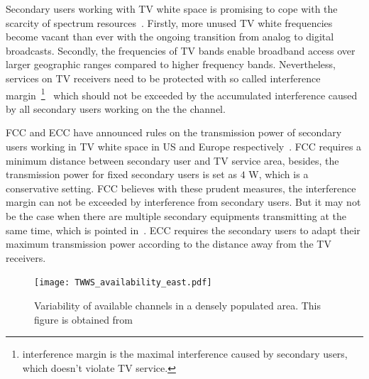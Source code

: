 \documentclass[times]{ettauth}
\theoremstyle{mytheoremstyle}
\theoremstyle{mytheoremstyle}
\theoremstyle{mytheoremstyle}
\begin{document}
Secondary users working with TV white space is promising to cope with the scarcity of spectrum resources~\cite{FCC_2010_sedond_memorandumm}. 
Firstly, more unused TV white frequencies become vacant than ever with the ongoing transition from analog to digital broadcasts. Secondly, the frequencies of TV bands enable broadband access over larger geographic ranges compared to higher frequency bands. Nevertheless, services on TV receivers need to be protected with so called interference margin~\footnote{interference margin is the maximal interference caused by secondary users, which doesn't violate TV service.}~\cite{multipleIntf_pimrc11} which should not be exceeded by the accumulated interference caused by all secondary users working on the the channel.

FCC and ECC have announced rules on the transmission power of secondary users working in TV white space in US and Europe respectively~\cite{FCC_2010_sedond_memorandumm, ecc159}. 
FCC requires a minimum distance between secondary user and TV service area, besides, the transmission power for fixed secondary users is set as $4$ \textup{W}, which is a conservative setting. %
FCC believes with these prudent measures, the interference margin can not be exceeded by interference from secondary users.
But it may not be the case when there are multiple secondary equipments transmitting at the same time, which is pointed in~\cite{Jaentti11}.
ECC requires the secondary users to adapt their maximum transmission power according to the distance away from the TV receivers.

\begin{figure}[h!]
  \centering
  \texttt{[image: TWWS\_availability\_east.pdf]}
  \caption{Variability of available channels in a densely populated area. This figure is obtained from \cite{googleDatabase}}
\label{variability_avai_channel}
\end{figure}
\end{document}
